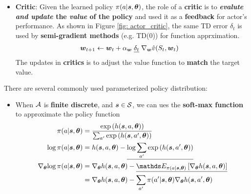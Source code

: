 \documentclass[11pt]{article}
\begin{document}
\begin{itemize}
\begin{itemize}
\begin{itemize}
\item \textbf{Critic}: Given the learned policy $\pi(a|\boldsymbol{s}, \boldsymbol{\theta})$, the role of a \textbf{critic} is to \textbf{\emph{evalute and update} the \emph{value} of the policy} and used it as a \textbf{feedback} for actor's performance. As shown in Figure \ref{fig: actor_critic}, the same TD error $\delta_t$ is used by \textbf{semi-gradient methods} (e.g. TD(0)) for function apprximation.
\begin{align}
\boldsymbol{w}_{t+1} &\leftarrow  \boldsymbol{w}_{t} + \alpha_{\boldsymbol{w}} \;\underline{\delta_{t}}\; \nabla_{\boldsymbol{w}}{\hat{v}(S_{t}, \boldsymbol{w}_{t})}  \label{eqn: critic_update}
\end{align} The updates in \textbf{critics} is to adjust the value function to \textbf{match} the target value.
\end{itemize}

There are several commonly used parameterized policy distribution:
\begin{itemize}
\item  When ${\mathcal A}$ is \textbf{finite discrete}, and $\boldsymbol{s} \in {\mathcal S}$, we can ues the \textbf{soft-max function} to approximate the policy function
\begin{align}
\pi(a |\mb{s}, \mb{\theta}) &= \frac{\exp\paren{h(\mb{s}, a, \mb{\theta})}}{\sum_{a'}\exp\paren{h(\mb{s}, a', \mb{\theta})}} \label{eqn: soft_max_policy} \\
\log \pi(a |\mb{s}, \mb{\theta}) &= h(\mb{s}, a, \mb{\theta}) -  \underline{\log \sum_{a'}\exp\paren{h(\mb{s}, a', \mb{\theta})}}  \label{eqn: log_soft_max_policy} \\
\grad{\mb{\theta}}{\log \pi(a |\mb{s}, \mb{\theta}) } &= \grad{\mb{\theta}}{h(\mb{s}, a, \mb{\theta})} - \underline{\E{\pi(a |\mb{s}, \mb{\theta}) }{ \grad{\mb{\theta}}{h(\mb{s}, a, \mb{\theta})}}}   \label{eqn: grad_log_soft_max_policy} \\
&= \grad{\mb{\theta}}{h(\mb{s}, a, \mb{\theta})} - \sum_{a'}\pi(a' |\mb{s}, \mb{\theta}) \grad{\mb{\theta}}{h(\mb{s}, a', \mb{\theta})} \nonumber
\end{align}


\end{itemize}
\end{itemize}
\end{itemize}
\end{document}
